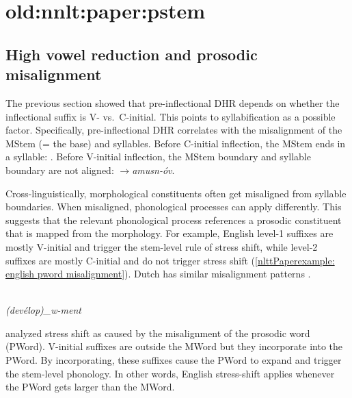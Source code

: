  \section{old:nnlt:paper:pstem}
\subsection{High vowel reduction and prosodic misalignment }\label{nlttPapersection: reduction: destressed reduction EA: pword and feet}

The previous section showed that pre-inflectional DHR depends on whether the inflectional suffix is V- vs.\ C-initial. This points to syllabification as a possible factor. Specifically, pre-inflectional DHR correlates with the misalignment of the MStem (= the base) and syllables. Before C-initial inflection, the MStem ends in a syllable: \textit{}. Before V-initial inflection, the MStem boundary and syllable boundary are not aligned: \textit{$\rightarrow$amusn-\'ov}. 


Cross-linguistically, morphological constituents often get misaligned from syllable boundaries. When misaligned, phonological processes can apply differently. This suggests that the relevant phonological process references a prosodic constituent that is mapped from the morphology. For example, English level-1 suffixes are mostly V-initial and trigger the stem-level rule of stress shift, while level-2 suffixes are mostly C-initial and do not trigger stress shift (\ref{nlttPaperexample: english pword misalignment}). Dutch has similar misalignment patterns \citep{Oostendorp-2004-CrossingMorphemeBoundariesDutch}.






\begin{exe}
	
	
	\ex {}\label{nlttPaperexample: english pword misalignment} \\
	\textit{(dev\'elop)_w-ment}
	
	
\end{exe} 


\cite{Raffelsiefen-1999-PhonoConstraintEnglishWords,Raffelsiefen-2005-ParadigmvsBoundary} analyzed stress shift as caused by the misalignment of the prosodic word (PWord). V-initial suffixes are outside the MWord but they incorporate into the PWord. By incorporating, these suffixes cause the PWord to expand and trigger the stem-level phonology. In other words, English stress-shift applies whenever the PWord gets larger than the MWord. 

